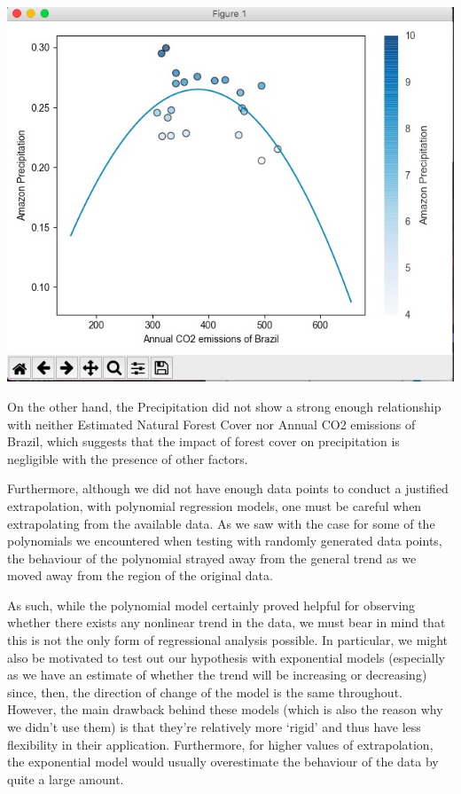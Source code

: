 \documentclass[12pt]{article}
\begin{document}
\begin{enumerate}
\begin{text}
\includegraphics[scale=0.5]{pics/CO2-Precipitation.png}

On the other hand, the Precipitation did not show a strong enough relationship with neither Estimated Natural Forest Cover nor Annual CO2 emissions of Brazil, which suggests that the impact of forest cover on precipitation is negligible with the presence of other factors.

Furthermore, although we did not have enough data points to conduct a justified extrapolation, with polynomial regression models, one must be careful when extrapolating from the available data. As we saw with the case for some of the polynomials we encountered when testing with randomly generated data points, the behaviour of the polynomial strayed away from the general trend as we moved away from the region of the original data.

As such, while the polynomial model certainly proved helpful for observing whether there exists any nonlinear trend in the data, we must bear in mind that this is not the only form of regressional analysis possible. In particular, we might also be motivated to test out our hypothesis with exponential models (especially as we have an estimate of whether the trend will be increasing or decreasing) since, then, the direction of change of the model is the same throughout. However, the main drawback behind these models (which is also the reason why we didn't use them) is that they're relatively more `rigid' and thus have less flexibility in their application. Furthermore, for higher values of extrapolation, the exponential model would usually overestimate the behaviour of the data by quite a large amount.


\end{text}
\end{enumerate}
\end{document}
